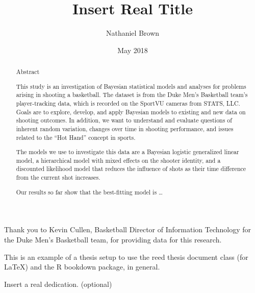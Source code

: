 \documentclass[12pt,twoside]{dukestatscithesis}
\title{Insert Real Title}
\author{Nathaniel Brown}
\date{May 2018}
\theoremstyle{definition}
\theoremstyle{definition}
\theoremstyle{definition}
\theoremstyle{remark}
\begin{document}
  \maketitle

\frontmatter %
\pagestyle{empty} %
  \begin{acknowledgements}
    Thank you to Kevin Cullen, Basketball Director of Information Technology
    for the Duke Men's Basketball team, for providing data for this
    research.
  \end{acknowledgements}
  \begin{preface}
    This is an example of a thesis setup to use the reed thesis document
    class (for LaTeX) and the R bookdown package, in general.
  \end{preface}
  \hypersetup{linkcolor=black}
  \setcounter{tocdepth}{2}
  \tableofcontents

  \listoftables

  \listoffigures
  \begin{abstract}
    \chapter{Abstract}\label{abstract}
    
    This study is an investigation of Bayesian statistical models and
    analyses for problems arising in shooting a basketball. The dataset is
    from the Duke Men's Basketball team's player-tracking data, which is
    recorded on the SportVU cameras from STATS, LLC. Goals are to explore,
    develop, and apply Bayesian models to existing and new data on shooting
    outcomes. In addition, we want to understand and evaluate questions of
    inherent random variation, changes over time in shooting performance,
    and issues related to the ``Hot Hand'' concept in sports.
    
    The models we use to investigate this data are a Bayesian logistic
    generalized linear model, a hierarchical model with mixed effects on the
    shooter identity, and a discounted likelihood model that reduces the
    influence of shots as their time difference from the current shot
    increases.
    
    Our results so far show that the best-fitting model is \ldots{}
  \end{abstract}
  \begin{dedication}
    Insert a real dedication. (optional)
  \end{dedication}
\mainmatter %
\pagestyle{fancyplain} %
\end{document}

